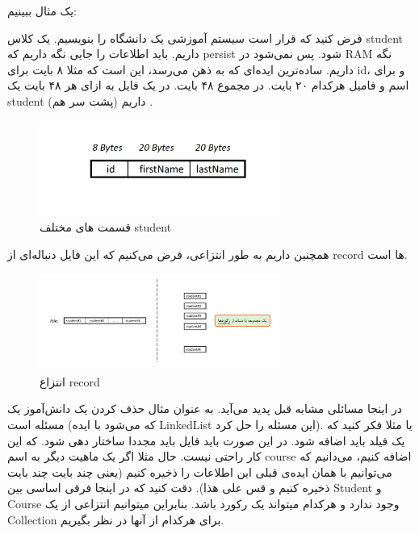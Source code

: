 یک مثال ببینیم:

 فرض کنید که قرار است سیستم آموزشی یک دانشگاه را بنویسیم. یک کلاس student داریم.
  باید اطلاعات را جایی نگه داریم که persist شود. پس نمی‌شود در RAM نگه داریم. ساده‌ترین ایده‌ای که به ذهن می‌رسد،
   این است که مثلا ۸ بایت برای id، و برای اسم و فامیل هرکدام ۲۰ بایت.
    در مجموع ۴۸ بایت. در یک فایل به ازای هر ۴۸ بایت یک student داریم (پشت سر هم)
    .
    
    \begin{figure}[H]
        \centering
        \includegraphics[width=0.7\textwidth]{source/stu1}
        \caption{قسمت های مختلف student}
    \end{figure}
    
    همچنین داریم به طور انتزاعی، فرض می‌کنیم که این فایل دنباله‌ای از record ها است.
    
    \begin{figure}[H]
        \centering
        \includegraphics[width=0.7\textwidth]{source/stu2}
        \caption{انتزاع record}
    \end{figure}
    
    در اینجا مسائلی مشابه قبل پدید می‌آید. 
    به عنوان مثال حذف کردن یک 
    دانش‌آموز یک مسئله است (که می‌شود با ایده LinkedList این مسئله را حل کرد).
 یا مثلا فکر کنید که یک فیلد باید اضافه شود.
  در این صورت باید فایل باید مجددا ساختار دهی شود. که این کار راحتی نیست. 
 حال مثلا اگر یک ماهیت دیگر به اسم course اضافه کنیم،
  می‌دانیم که می‌توانیم با همان ایده‌ی قبلی این اطلاعات را ذخیره کنیم (یعنی چند بایت چند بایت ذخیره کنیم و قس علی هذا).
   دقت کنید که در اینجا فرقی اساسی بین Student و Course وجود ندارد و هرکدام میتواند یک رکورد باشد. بنابراین میتوانیم انتزاعی از یک Collection برای هرکدام از آنها در نظر بگیریم.
   
